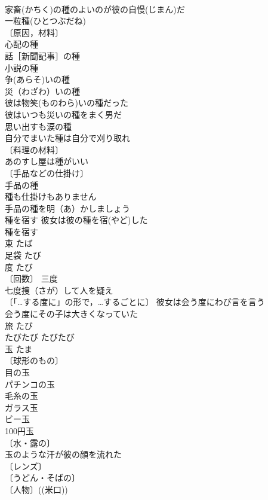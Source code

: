 \documentclass[8pt]{extreport}
\begin{document}
\begin{CJK}{UTF8}{min}
\\	家畜(かちく)の種のよいのが彼の自慢(じまん)だ 
\\	一粒種(ひとつぶだね) 
\\	〔原因，材料〕
\\	心配の種 
\\	話［新聞記事］の種 
\\	小説の種 
\\	争(あらそ)いの種 
\\	災（わざわ）いの種 
\\	彼は物笑(ものわら)いの種だった 
\\	彼はいつも災いの種をまく男だ 
\\	思い出すも涙の種 
\\	自分でまいた種は自分で刈り取れ 
\\	〔料理の材料〕
\\	あのすし屋は種がいい 
\\	〔手品などの仕掛け〕
\\	手品の種 
\\	種も仕掛けもありません 
\\	手品の種を明（あ）かしましょう 
\\	種を宿す 彼女は彼の種を宿(やど)した 
\\	種を宿す　
\\	束	たば	
\\	足袋	たび	
\\	度	たび	
\\	〔回数〕 三度 
\\	七度捜（さが）して人を疑え 
\\	〔「…する度に」の形で，…するごとに〕 彼女は会う度にわび言を言う 
\\	会う度にその子は大きくなっていた 
\\	旅	たび	
\\	たびたび	たびたび	
\\	玉	たま	
\\	〔球形のもの〕
\\	目の玉 
\\	パチンコの玉 
\\	毛糸の玉 
\\	ガラス玉 
\\	ビー玉 
\\	100円玉 
\\	〔水・露の〕
\\	玉のような汗が彼の顔を流れた 
\\	〔レンズ〕
\\	〔うどん・そばの〕
\\	〔人物〕((米口)) 

\end{CJK}
\end{document}
